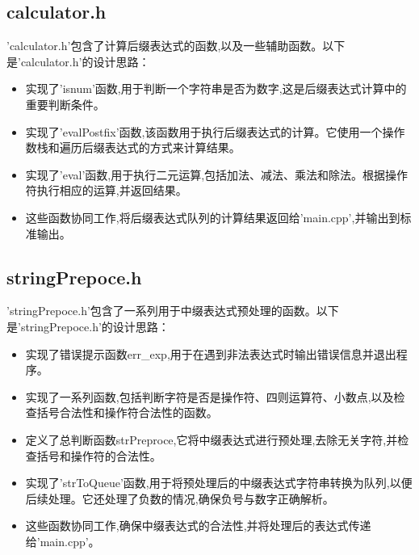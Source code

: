 \documentclass[12pt, a4paper, oneside]{ctexart}
\begin{document}
\subsection{calculator.h}
'calculator.h'包含了计算后缀表达式的函数,以及一些辅助函数。以下是'calculator.h'的设计思路：

\begin{itemize}
\item 实现了'isnum'函数,用于判断一个字符串是否为数字,这是后缀表达式计算中的重要判断条件。

\item 实现了'evalPostfix'函数,该函数用于执行后缀表达式的计算。它使用一个操作数栈和遍历后缀表达式的方式来计算结果。

\item 实现了'eval'函数,用于执行二元运算,包括加法、减法、乘法和除法。根据操作符执行相应的运算,并返回结果。

\item 这些函数协同工作,将后缀表达式队列的计算结果返回给'main.cpp',并输出到标准输出。

\end{itemize}

\subsection{stringPrepoce.h}
'stringPrepoce.h'包含了一系列用于中缀表达式预处理的函数。以下是'stringPrepoce.h'的设计思路：

\begin{itemize}
\item 实现了错误提示函数err\_exp,用于在遇到非法表达式时输出错误信息并退出程序。

\item 实现了一系列函数,包括判断字符是否是操作符、四则运算符、小数点,以及检查括号合法性和操作符合法性的函数。

\item 定义了总判断函数strPreproce,它将中缀表达式进行预处理,去除无关字符,并检查括号和操作符的合法性。

\item 实现了'strToQueue'函数,用于将预处理后的中缀表达式字符串转换为队列,以便后续处理。它还处理了负数的情况,确保负号与数字正确解析。

\item 这些函数协同工作,确保中缀表达式的合法性,并将处理后的表达式传递给'main.cpp'。

\end{itemize}
\end{document}
